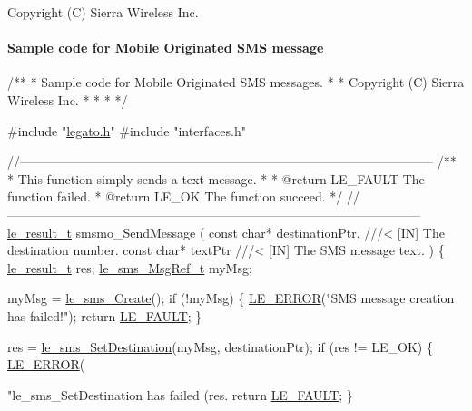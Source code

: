 Copyright (C) Sierra Wireless Inc. \hypertarget{c_smsSampleMO}{}\paragraph{Sample code for Mobile Originated S\+MS message}\label{c_smsSampleMO}

\begin{DoxyCodeInclude}
\textcolor{comment}{ /**}
\textcolor{comment}{  * Sample code for Mobile Originated SMS messages.}
\textcolor{comment}{  *}
\textcolor{comment}{  * Copyright (C) Sierra Wireless Inc.}
\textcolor{comment}{  *}
\textcolor{comment}{  *}
\textcolor{comment}{  *}
\textcolor{comment}{  */}

\textcolor{preprocessor}{#include "\hyperlink{legato_8h}{legato.h}"}
\textcolor{preprocessor}{#include "interfaces.h"}


\textcolor{comment}{//--------------------------------------------------------------------------------------------------}\textcolor{comment}{}
\textcolor{comment}{/**}
\textcolor{comment}{ * This function simply sends a text message.}
\textcolor{comment}{ *}
\textcolor{comment}{ * @return LE\_FAULT  The function failed.}
\textcolor{comment}{ * @return LE\_OK     The function succeed.}
\textcolor{comment}{ */}
\textcolor{comment}{//--------------------------------------------------------------------------------------------------}
\hyperlink{le__basics_8h_a1cca095ed6ebab24b57a636382a6c86c}{le\_result\_t} smsmo\_SendMessage
(
    \textcolor{keyword}{const} \textcolor{keywordtype}{char}*   destinationPtr, \textcolor{comment}{///< [IN] The destination number.}
\textcolor{comment}{}    \textcolor{keyword}{const} \textcolor{keywordtype}{char}*   textPtr         \textcolor{comment}{///< [IN] The SMS message text.}
\textcolor{comment}{})
\{
    \hyperlink{le__basics_8h_a1cca095ed6ebab24b57a636382a6c86c}{le\_result\_t}           res;
    \hyperlink{le__sms__interface_8h_a8eb2a15362fe26516fc68fd7a7d5e3e7}{le\_sms\_MsgRef\_t}      myMsg;

    myMsg = \hyperlink{le__sms__interface_8h_a668abcbcff2f1f3c5cdf799315a81058}{le\_sms\_Create}();
    \textcolor{keywordflow}{if} (!myMsg)
    \{
        \hyperlink{le__log_8h_a353590f91b3143a7ba3a416ae5a50c3d}{LE\_ERROR}(\textcolor{stringliteral}{"SMS message creation has failed!"});
        \textcolor{keywordflow}{return} \hyperlink{le__basics_8h_a1cca095ed6ebab24b57a636382a6c86cac409634423b6b1ef09643529f6224798}{LE\_FAULT};
    \}

    res = \hyperlink{le__sms__interface_8h_a6fda3e193c9662c394412816ae508c23}{le\_sms\_SetDestination}(myMsg, destinationPtr);
    \textcolor{keywordflow}{if} (res != LE\_OK)
    \{
        \hyperlink{le__log_8h_a353590f91b3143a7ba3a416ae5a50c3d}{LE\_ERROR}(\textcolor{stringliteral}{"le\_sms\_SetDestination has failed (res.%
        \textcolor{keywordflow}{return} \hyperlink{le__basics_8h_a1cca095ed6ebab24b57a636382a6c86cac409634423b6b1ef09643529f6224798}{LE\_FAULT};
    \}

}
\end{DoxyCodeInclude}
